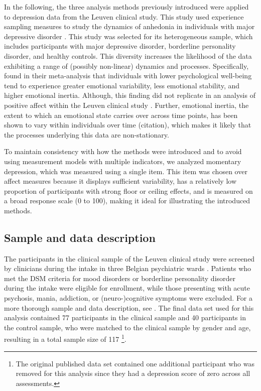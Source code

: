 \documentclass[man, floatsintext]{apa7}
\begin{document}
In the following, the three analysis methods previously introduced were applied
to depression data from the Leuven clinical study. This study used experience
sampling measures to study the dynamics of anhedonia in individuals with major
depressive disorder \parencite{heininga_dynamical_2019}. This study was
selected for its heterogeneous sample, which includes participants with major
depressive disorder, borderline personality disorder, and healthy controls.
This diversity increases the likelihood of the data exhibiting a range of
(possibly non-linear) dynamics and processes. Specifically,
\textcite{houben_relation_2015} found in their meta-analysis that individuals
with lower psychological well-being tend to experience greater emotional
variability, less emotional stability, and higher emotional inertia. Although,
this finding did not replicate in an analysis of positive affect within the
Leuven clinical study \parencite{heininga_dynamical_2019}. Further, emotional
inertia, the extent to which an emotional state carries over across time
points, has been shown to vary within individuals over time (citation), which
makes it likely that the processes underlying this data are non-stationary.

To maintain consistency with how the methods were introduced and to avoid using
measurement models with multiple indicators, we analyzed momentary depression,
which was measured using a single item. This item was chosen over affect
measures because it displays sufficient variability, has a relatively low
proportion of participants with strong floor or ceiling effects, and is
measured on a broad response scale (0 to 100), making it ideal for illustrating
the introduced methods.

\subsection{Sample and data description}

The participants in the clinical sample of the Leuven clinical study were
screened by clinicians during the intake in three Belgian psychiatric wards
\parencite{heininga_dynamical_2019}. Patients who met the DSM criteria for mood
disorders or borderline personality disorder during the intake were eligible
for enrollment, while those presenting with acute psychosis, mania, addiction,
or (neuro-)cognitive symptoms were excluded. For a more thorough sample and
data description, see \textcite{heininga_dynamical_2019}. The final data set
used for this analysis contained 77 participants in the clinical sample and 40
participants in the control sample, who were matched to the clinical sample by
gender and age, resulting in a total sample size of 117 \footnote{The original
  published data set contained one additional participant who was removed for
  this analysis since they had a depression score of zero across all
  assessments.}.
\end{document}
